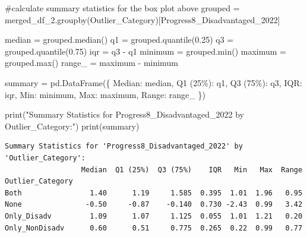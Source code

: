 \documentclass[
  letterpaper,
  DIV=11,
  numbers=noendperiod]{scrartcl}
\newenvironment{Shaded}{\begin{snugshade}}{\end{snugshade}}
\newcommand{\BuiltInTok}[1]{\textcolor[rgb]{0.00,0.23,0.31}{#1}}
\newcommand{\CommentTok}[1]{\textcolor[rgb]{0.37,0.37,0.37}{#1}}
\newcommand{\FloatTok}[1]{\textcolor[rgb]{0.68,0.00,0.00}{#1}}
\newcommand{\NormalTok}[1]{\textcolor[rgb]{0.00,0.23,0.31}{#1}}
\newcommand{\OperatorTok}[1]{\textcolor[rgb]{0.37,0.37,0.37}{#1}}
\newcommand{\StringTok}[1]{\textcolor[rgb]{0.13,0.47,0.30}{#1}}
\begin{document}
\begin{Shaded}
\begin{Highlighting}[]
\CommentTok{\#calculate summary statistics for the box plot above}
\NormalTok{grouped }\OperatorTok{=}\NormalTok{ merged\_df\_2.groupby(}\StringTok{\textquotesingle{}Outlier\_Category\textquotesingle{}}\NormalTok{)[}\StringTok{\textquotesingle{}Progress8\_Disadvantaged\_2022\textquotesingle{}}\NormalTok{]}


\NormalTok{median }\OperatorTok{=}\NormalTok{ grouped.median()}
\NormalTok{q1 }\OperatorTok{=}\NormalTok{ grouped.quantile(}\FloatTok{0.25}\NormalTok{)}
\NormalTok{q3 }\OperatorTok{=}\NormalTok{ grouped.quantile(}\FloatTok{0.75}\NormalTok{)}
\NormalTok{iqr }\OperatorTok{=}\NormalTok{ q3 }\OperatorTok{{-}}\NormalTok{ q1}
\NormalTok{minimum }\OperatorTok{=}\NormalTok{ grouped.}\BuiltInTok{min}\NormalTok{()}
\NormalTok{maximum }\OperatorTok{=}\NormalTok{ grouped.}\BuiltInTok{max}\NormalTok{()}
\NormalTok{range\_ }\OperatorTok{=}\NormalTok{ maximum }\OperatorTok{{-}}\NormalTok{ minimum}


\NormalTok{summary }\OperatorTok{=}\NormalTok{ pd.DataFrame(\{}
    \StringTok{\textquotesingle{}Median\textquotesingle{}}\NormalTok{: median,}
    \StringTok{\textquotesingle{}Q1 (25\%)\textquotesingle{}}\NormalTok{: q1,}
    \StringTok{\textquotesingle{}Q3 (75\%)\textquotesingle{}}\NormalTok{: q3,}
    \StringTok{\textquotesingle{}IQR\textquotesingle{}}\NormalTok{: iqr,}
    \StringTok{\textquotesingle{}Min\textquotesingle{}}\NormalTok{: minimum,}
    \StringTok{\textquotesingle{}Max\textquotesingle{}}\NormalTok{: maximum,}
    \StringTok{\textquotesingle{}Range\textquotesingle{}}\NormalTok{: range\_}
\NormalTok{\})}

\BuiltInTok{print}\NormalTok{(}\StringTok{"Summary Statistics for \textquotesingle{}Progress8\_Disadvantaged\_2022\textquotesingle{} by \textquotesingle{}Outlier\_Category\textquotesingle{}:"}\NormalTok{)}
\BuiltInTok{print}\NormalTok{(summary)}
\end{Highlighting}
\end{Shaded}

\begin{verbatim}
Summary Statistics for 'Progress8_Disadvantaged_2022' by 'Outlier_Category':
                  Median  Q1 (25%)  Q3 (75%)    IQR   Min   Max  Range
Outlier_Category                                                      
Both                1.40      1.19     1.585  0.395  1.01  1.96   0.95
None               -0.50     -0.87    -0.140  0.730 -2.43  0.99   3.42
Only_Disadv         1.09      1.07     1.125  0.055  1.01  1.21   0.20
Only_NonDisadv      0.60      0.51     0.775  0.265  0.22  0.99   0.77
\end{verbatim}
\end{document}
